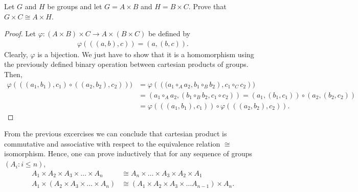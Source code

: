 \documentclass[12pt]{article}
\newenvironment{problem}[2][Problem]{\begin{trivlist} \item[\hskip \labelsep {\bfseries #1}\hskip \labelsep {\bfseries #2.}]}{\end{trivlist}}
\begin{document}
\begin{problem}{12}
  Let $G$ and $H$ be groups and let $G=A\times B$ and $H=B\times C$. Prove that $G\times C \cong A\times H$.
\begin{proof}
  Let $\varphi:(A\times B)\times C \to A\times (B\times C)$ be defined by 
\begin{align*}
  \varphi\left( \left( (a,b),c \right) \right) = \left( a,(b,c) \right).
\end{align*}
Clearly, $\varphi$ is a bijection. We just have to show that it is a homomorphism using the previously defined binary operation between cartesian products of groups. Then,
\begin{align*}
\varphi\left( ((a_{1},b_{1}),c_{1})\circ ( (a_{2},b_{2}),c_{2}) \right) )&= \varphi\left(  \left( (a_{1}\circ_{A} a_{2},b_{1}\circ_{B} b_{2} \right), c_{1}\circ_{C} c_{2}\right) )\\
&= \left( a_{1}\circ_{A} a_{2}, \left( b_{1}\circ_{B} b_{2}, c_{1}\circ c_{2} \right) \right) = \left( a_{1},\left( b_{1},c_{1} \right) \right) \circ \left( a_{2}, \left( b_{2},c_{2} \right) \right)\\
&= \varphi\left( \left( (a_{1},b_{1}),c_{1} \right) \right) \circ \varphi\left( \left( (a_{2},b_{2}),c_{2} \right) \right).
\end{align*}
\end{proof}
\end{problem}

From the previous excercises we can conclude that cartesian product is commutative and associative with respect to the equivalence relation $\cong$ isomorphism. Hence, one can prove inductively that for any sequence of groups $(A_{i}:i\leq n)$,  
\begin{align*}
  A_{1}\times A_{2} \times A_{3} \times \dots \times A_{n} &\cong A_{n} \times \dots \times A_{3} \times A_{2} \times A_{1} \\
  A_{1} \times \left( A_{2}\times A_{3} \times \dots \times A_{n} \right) & \cong \left( A_{1}\times A_{2} \times A_{3} \times \dots A_{n-1} \right) \times A_{n}.
\end{align*}
\end{document}
